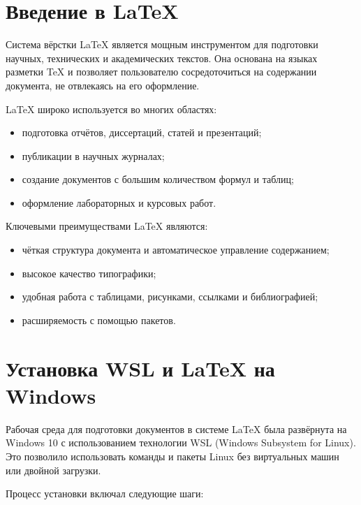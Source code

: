 \documentclass[a4paper,12pt]{report}
\begin{document}
\section{Введение в \LaTeX{}}

Система вёрстки \LaTeX{} является мощным инструментом для подготовки научных, технических и академических текстов. Она основана на языках разметки TeX и позволяет пользователю сосредоточиться на содержании документа, не отвлекаясь на его оформление. 

\LaTeX{} широко используется во многих областях:
\begin{itemize}
    \item подготовка отчётов, диссертаций, статей и презентаций;
    \item публикации в научных журналах;
    \item создание документов с большим количеством формул и таблиц;
    \item оформление лабораторных и курсовых работ.
\end{itemize}

Ключевыми преимуществами \LaTeX{} являются:
\begin{itemize}
    \item чёткая структура документа и автоматическое управление содержанием;
    \item высокое качество типографики;
    \item удобная работа с таблицами, рисунками, ссылками и библиографией;
    \item расширяемость с помощью пакетов.
\end{itemize}



\section{Установка WSL и \LaTeX{} на Windows}

Рабочая среда для подготовки документов в системе \LaTeX{} была развёрнута на Windows 10 с использованием технологии WSL (Windows Subsystem for Linux). Это позволило использовать команды и пакеты Linux без виртуальных машин или двойной загрузки.

Процесс установки включал следующие шаги:
\end{document}
